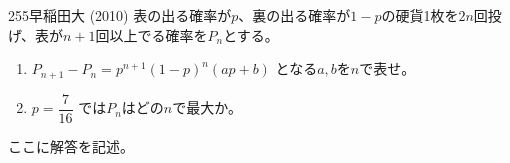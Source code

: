 \begin{prob}{255}{}{早稲田大 (2010)}
 表の出る確率が$p$、裏の出る確率が$1-p$の硬貨1枚を$2n$回投げ、表が$n+1$回以上でる確率を$P_n$とする。
 \begin{enumerate}
  \item $P_{n+1}-P_n=p^{n+1}(1-p)^n(ap+b)$ となる$a,b$を$n$で表せ。
  \item $p=\dfrac{7}{16}$ では$P_n$はどの$n$で最大か。
 \end{enumerate}
\end{prob}

ここに解答を記述。